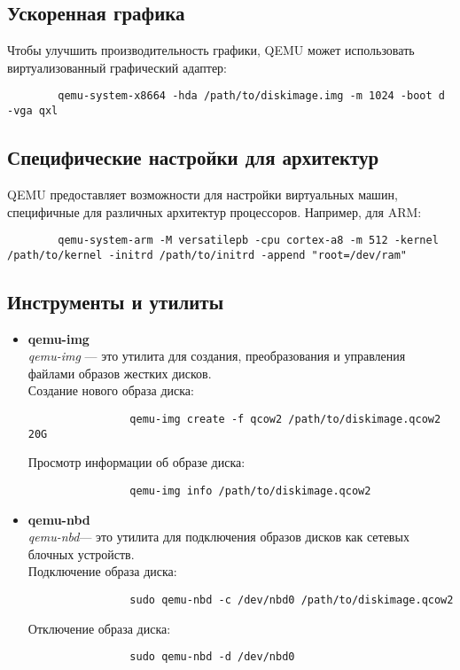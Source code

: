     \subsection{Ускоренная графика}
    Чтобы улучшить производительность графики, QEMU может использовать виртуализованный графический адаптер:
    \begin{lstlisting}
        qemu-system-x8664 -hda /path/to/diskimage.img -m 1024 -boot d -vga qxl
    \end{lstlisting}

    \subsection{Специфические настройки для архитектур}
    QEMU предоставляет возможности для настройки виртуальных машин, специфичные для различных архитектур процессоров. Например, для ARM:
    \begin{lstlisting}
        qemu-system-arm -M versatilepb -cpu cortex-a8 -m 512 -kernel /path/to/kernel -initrd /path/to/initrd -append "root=/dev/ram"
    \end{lstlisting}

    \subsection{Инструменты и утилиты}

    \begin{itemize}
        \item \textbf{qemu-img} \\
            \textit{qemu-img} — это утилита для создания, преобразования и управления файлами образов жестких дисков. \\
            Создание нового образа диска: \\
            \begin{lstlisting}
                qemu-img create -f qcow2 /path/to/diskimage.qcow2 20G
            \end{lstlisting}
            Просмотр информации об образе диска: \\
            \begin{lstlisting}
                qemu-img info /path/to/diskimage.qcow2
            \end{lstlisting}
        \item \textbf{qemu-nbd} \\
            \textit{qemu-nbd}— это утилита для подключения образов дисков как сетевых блочных устройств. \\
            Подключение образа диска: \\
            \begin{lstlisting}
                sudo qemu-nbd -c /dev/nbd0 /path/to/diskimage.qcow2
            \end{lstlisting}
            Отключение образа диска: \\
            \begin{lstlisting}
                sudo qemu-nbd -d /dev/nbd0
            \end{lstlisting}
    \end{itemize}

